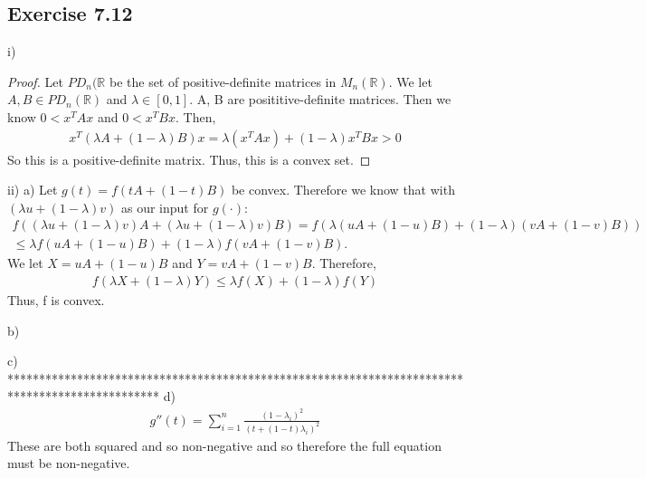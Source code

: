 \documentclass[11.5pt, letterpaper, bibtotoc,
    tablecaptionabove, figurecaptionabove]{article}
\begin{document}
\subsection*{Exercise 7.12}
i)
\begin{proof}
	Let $PD_n(\mathbb{R}$ be the set of positive-definite matrices in $M_n(\mathbb{R})$.  We let $ A, B \in PD_n(\mathbb{R})$ and $\lambda \in [0,1]$.  A, B are posititive-definite matrices. Then we know $0 < x^TAx$ and $0 < x^TBx$.  Then,
\begin{align*}
	x^T(\lambda A + (1 - \lambda) B) x = \lambda(x^T A x) + (1 - \lambda) x^T B x > 0
\end{align*}
So this is a positive-definite matrix.  Thus, this is a convex set.
\end{proof}
ii)
a) Let $g(t) = f(tA + (1 - t)B)$ be convex.  Therefore we know that with $(\lambda u + (1-\lambda) v)$ as our input for $g(\cdot)$:
\begin{align*}
	f((\lambda u + (1-\lambda) v)A + (\lambda u + (1-\lambda) v)B) = f(\lambda(uA + (1 - u)B) + (1 - \lambda)(vA + (1 - v)B)) \\
	\leq \lambda f(uA + (1 - u)B) + (1 - \lambda)f(vA + (1 - v)B).
\end{align*}
We let $X = uA + (1 - u)B$ and $Y = vA + (1-v)B$. Therefore,
\begin{align*}
	f(\lambda X + (1 - \lambda)Y) \leq \lambda f(X) + (1 - \lambda)f(Y)
\end{align*}
Thus, f is convex.

b) 

c)
************************************************************************************************
d)
\begin{align*}
	g''(t) = \sum^n_{i=1} \frac{(1 - \lambda_i)^2}{(t + (1 - t)\lambda_i)^2}
\end{align*}
These are both squared and so non-negative and so therefore the full equation must be non-negative.
\end{document}
